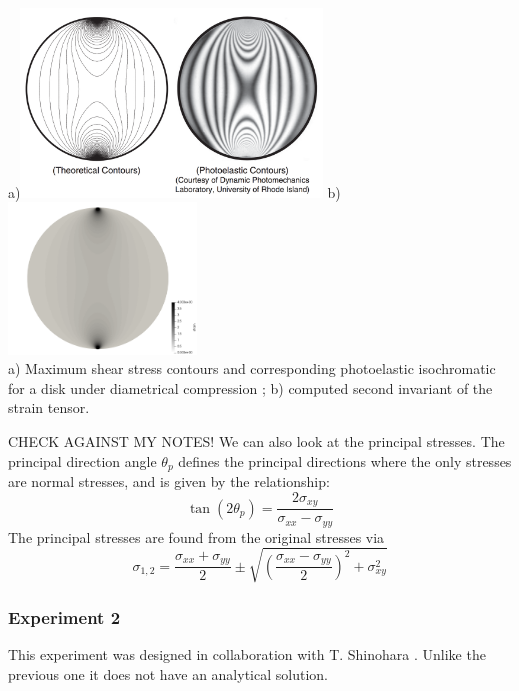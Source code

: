 \newpage

\begin{center}
a)\includegraphics[width=8cm]{python_codes/fieldstone_58/experiment1/contours}
b)\includegraphics[width=5cm]{python_codes/fieldstone_58/experiment1/111/e_2}\\
{\captionfont 
a) Maximum shear stress contours and corresponding photoelastic isochromatic 
for a disk under diametrical compression \cite{sadd14};
b) computed second invariant of the strain tensor.}
\end{center}





CHECK AGAINST MY NOTES!
We can also look at the principal stresses.
The principal direction angle $\theta_p$ defines the principal
directions where the only stresses are normal stresses, and 
is given by the relationship:
\[
\tan (2\theta_p) =  \frac{2 \sigma_{xy}}{\sigma_{xx} -\sigma_{yy}}
\]
The principal stresses are found from the original stresses via
 \[
\sigma_{1,2}=\frac{\sigma_{xx}+\sigma_{yy}}{2} \pm \sqrt{  \left(\frac{\sigma_{xx}-\sigma_{yy}}{2}\right)^2 +\sigma_{xy}^2 }
 \]



\newpage
\subsubsection*{Experiment 2}

This experiment was designed in collaboration with T. Shinohara . 
Unlike the previous one it does not have an analytical solution. 
 
